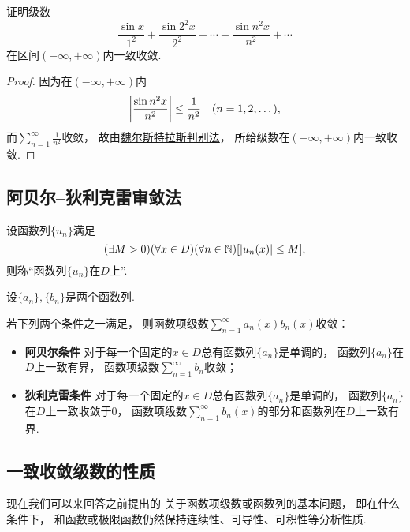 \begin{example}
证明级数\[
	\frac{\sin x}{1^2}
	+ \frac{\sin 2^2 x}{2^2}
	+ \dotsb
	+ \frac{\sin n^2 x}{n^2}
	+ \dotsb
\]在区间\((-\infty,+\infty)\)内一致收敛.
\begin{proof}
因为在\((-\infty,+\infty)\)内\[
	\abs{\frac{\sin n^2 x}{n^2}} \leq \frac{1}{n^2}
	\quad(n=1,2,\dotsc),
\]
而\(\sum_{n=1}^\infty \frac{1}{n^2}\)收敛，
故由\hyperref[theorem:无穷级数.魏尔斯特拉斯判别法]{魏尔斯特拉斯判别法}，
所给级数在\((-\infty,+\infty)\)内一致收敛.
\end{proof}
\end{example}

\subsection{阿贝尔--狄利克雷审敛法}
\begin{definition}
设函数列\(\{u_n\}\)满足\[
	(\exists M>0)
	(\forall x \in D)
	(\forall n\in\mathbb{N})
	[\abs{u_n(x)} \leq M],
\]
则称“函数列\(\{u_n\}\)在\(D\)上”.
\end{definition}

\begin{theorem}\label{theorem:函数项级数.函数项级数的阿贝尔--狄利克雷审敛法}
设\(\{a_n\},\{b_n\}\)是两个函数列.

若下列两个条件之一满足，
则函数项级数\(\sum_{n=1}^\infty a_n(x) b_n(x)\)收敛：\begin{itemize}
	\item {\bf 阿贝尔条件}
	对于每一个固定的\(x \in D\)总有函数列\(\{a_n\}\)是单调的，
	函数列\(\{a_n\}\)在\(D\)上一致有界，
	函数项级数\(\sum_{n=1}^\infty b_n\)收敛；

	\item {\bf 狄利克雷条件}
	对于每一个固定的\(x \in D\)总有函数列\(\{a_n\}\)是单调的，
	函数列\(\{a_n\}\)在\(D\)上一致收敛于\(0\)，
	函数项级数\(\sum_{n=1}^\infty b_n(x)\)的部分和函数列在\(D\)上一致有界.
\end{itemize}
\end{theorem}

\subsection{一致收敛级数的性质}
现在我们可以来回答之前提出的
关于函数项级数或函数列的基本问题，
即在什么条件下，
和函数或极限函数仍然保持连续性、可导性、可积性等分析性质.

